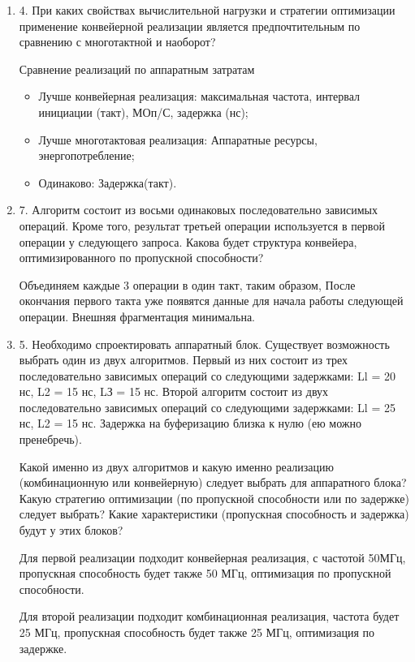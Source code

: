 \documentclass[a4paper,14pt]{article}
\begin{document}
	\begin{enumerate}
		\item 4. При каких свойствах вычислительной нагрузки и стратегии оптимизации применение	конвейерной реализации является предпочтительным по сравнению с многотактной и наоборот?
		
		Сравнение реализаций по аппаратным затратам
		\begin{itemize}
			\item Лучше конвейерная реализация: максимальная частота, интервал инициации (такт), МОп/С, задержка (нс);
			
			\item Лучше многотактовая реализация: Аппаратные ресурсы, энергопотребление;
			
			\item Одинаково: Задержка(такт).
		\end{itemize}
		
		\item 7. Алгоритм состоит из восьми одинаковых последовательно зависимых операций.	Кроме того, результат третьей операции используется в первой операции у следующего запроса. Какова будет структура конвейера, оптимизированного по пропускной способности?
		
		Объединяем каждые 3 операции в один такт, таким образом, После окончания первого такта уже появятся данные для начала работы следующей операции. Внешняя фрагментация минимальна.
	
		\item 5. Необходимо спроектировать аппаратный блок. Существует возможность выбрать один из двух алгоритмов. Первый из них состоит из трех последовательно зависимых операций со следующими задержками: Ll = 20 нс, L2 = 15 нс, LЗ = 15 нс. Второй	алгоритм состоит из двух последовательно зависимых операций со следующими задержками: Ll = 25 нс, L2 = 15 нс. Задержка на буферизацию близка к нулю (ею	можно пренебречь). 
		
		Какой именно из двух алгоритмов и какую именно реализацию (комбинационную или конвейерную) следует выбрать для аппаратного блока? 		
		Какую стратегию оптимизации (по пропускной способности или по задержке) следует выбрать? 		
		Какие характеристики (пропускная способность и задержка) будут у этих блоков?
		
		Для первой реализации подходит конвейерная реализация, с частотой 50МГц, пропускная способность будет также 50 МГц, оптимизация по пропускной способности.
		
		Для второй реализации подходит комбинационная реализация, частота будет 25 МГц, пропускная способность будет также 25 МГц, оптимизация по задержке.
		
		
		
	\end{enumerate}
	
\end{document}
